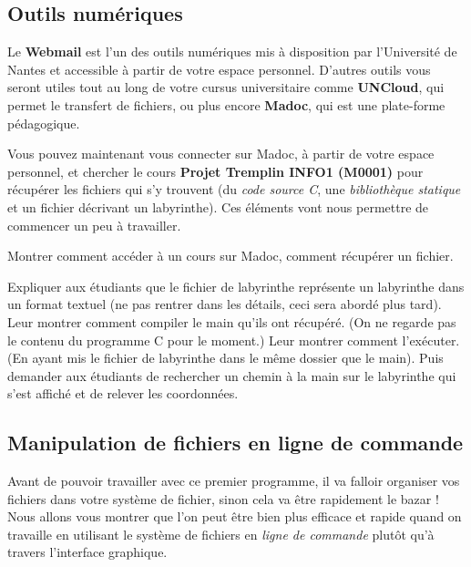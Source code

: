 \documentclass[a4paper]{article}
\newenvironment{enseignants}[1]{\noindent\color{blue}{\bf #1}}{}
\begin{document}
\subsection{Outils numériques}

Le \textbf{Webmail} est l’un des outils numériques mis à disposition par l’Université de Nantes et accessible à partir de votre espace personnel. D’autres outils vous seront utiles tout au long de votre cursus universitaire comme \textbf{UNCloud}, qui permet le transfert de fichiers, ou plus encore \textbf{Madoc}, qui est une plate-forme pédagogique.

Vous pouvez maintenant vous connecter sur Madoc, à partir de votre espace personnel, et chercher le cours \textbf{Projet Tremplin INFO1 (M0001)} pour récupérer les fichiers qui s'y trouvent (du \emph{code source C}, une \emph{bibliothèque statique} et un fichier décrivant un labyrinthe). Ces éléments vont nous permettre de commencer un peu à travailler.

\begin{enseignants}{Madoc~:}
  Montrer comment accéder à un cours sur Madoc, comment récupérer un fichier.
\end{enseignants}

\begin{enseignants}{}
  Expliquer aux étudiants que le fichier de labyrinthe représente un labyrinthe dans un format textuel (ne pas rentrer dans les détails, ceci sera abordé plus tard).
  Leur montrer comment compiler le main qu'ils ont récupéré. (On ne regarde pas le contenu du programme C pour le moment.)
  Leur montrer comment l'exécuter. (En ayant mis le fichier de labyrinthe dans le même dossier que le main).
  Puis demander aux étudiants de rechercher un chemin à la main sur le labyrinthe qui s'est affiché et de relever les coordonnées.
\end{enseignants}

\subsection{Manipulation de fichiers en ligne de commande}

Avant de pouvoir travailler avec ce premier programme, il va falloir organiser vos fichiers dans votre système de fichier, sinon cela va être rapidement le bazar ! Nous allons vous montrer que l’on peut être bien plus efficace et rapide quand on travaille en utilisant le système de fichiers en \emph{ligne de commande} plutôt qu'à travers l’interface graphique.
\end{document}
